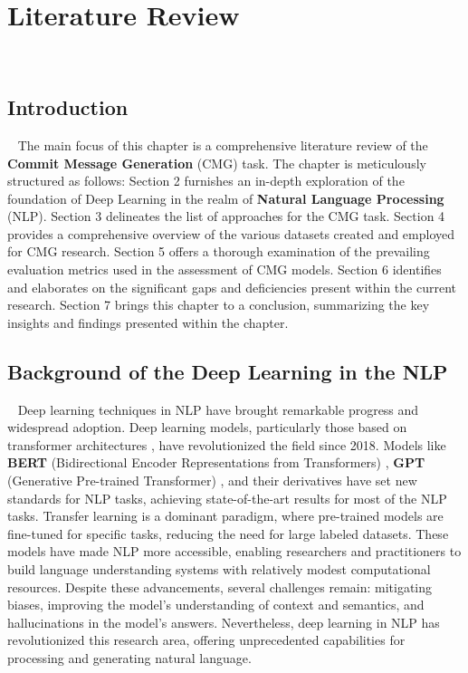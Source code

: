 \chapter{Literature Review}
~\label{chap:lr}




\section{Introduction}~\label{sec:lr_intro}
The main focus of this chapter is a comprehensive literature review of the \textbf{Commit Message Generation} (CMG) task. The chapter is meticulously structured as follows: Section 2 furnishes an in-depth exploration of the foundation of Deep Learning in the realm of \textbf{Natural Language Processing} (NLP). Section 3 delineates the list of approaches for the CMG task. Section 4 provides a comprehensive overview of the various datasets created and employed for CMG research. Section 5 offers a thorough examination of the prevailing evaluation metrics used in the assessment of CMG models. Section 6 identifies and elaborates on the significant gaps and deficiencies present within the current research. Section 7 brings this chapter to a conclusion, summarizing the key insights and findings presented within the chapter.


\section{Background of the Deep Learning in the NLP}~\label{sec:lr_background}
Deep learning techniques in NLP have brought remarkable progress and widespread adoption. Deep learning models, particularly those based on transformer architectures{ }\cite{vaswani2017attention}, have revolutionized the field since 2018. Models like \textbf{BERT} (Bidirectional Encoder Representations from Transformers){ }\cite{devlin2018bert}, \textbf{GPT} (Generative Pre-trained Transformer){ }\cite{radford2018improving}, and their derivatives have set new standards for NLP tasks, achieving state-of-the-art results for most of the NLP tasks. Transfer learning is a dominant paradigm, where pre-trained models are fine-tuned for specific tasks, reducing the need for large labeled datasets. These models have made NLP more accessible, enabling researchers and practitioners to build language understanding systems with relatively modest computational resources. Despite these advancements, several challenges remain: mitigating biases,  improving the model's understanding of context and semantics, and hallucinations in the model's answers. Nevertheless, deep learning in NLP has revolutionized this research area, offering unprecedented capabilities for processing and generating natural language.


